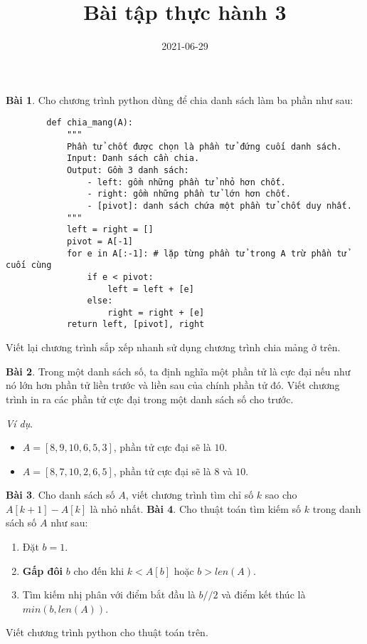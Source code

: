 \documentclass[12pt, a4paper]{article}
\title{Bài tập thực hành 3}
\date{2021-06-29}
\author{}
\begin{document}
    \onehalfspacing
    \maketitle
    \textbf{Bài 1}. Cho chương trình python dùng để chia danh sách làm ba phần như sau:
    \begin{verbatim}
        def chia_mang(A):
            """
            Phần tử chốt được chọn là phần tử đứng cuối danh sách.
            Input: Danh sách cần chia.
            Output: Gồm 3 danh sách:
                - left: gồm những phần tử nhỏ hơn chốt.
                - right: gồm những phần tử lớn hơn chốt.
                - [pivot]: danh sách chứa một phần tử chốt duy nhất.
            """
            left = right = []
            pivot = A[-1]
            for e in A[:-1]: # lặp từng phần tử trong A trừ phần tử cuối cùng
                if e < pivot:
                    left = left + [e]
                else:
                    right = right + [e]
            return left, [pivot], right
    \end{verbatim}
    Viết lại chương trình sắp xếp nhanh sử dụng chương trình chia mảng ở trên.

    \textbf{Bài 2}. Trong một danh sách số, ta định nghĩa một phần tử là cực đại nếu như 
    nó lớn hơn phần tử liền trước và liền sau của chính phần tử đó.
    Viết chương trình in ra các phần tử cực đại trong một danh sách số cho trước.

    \textit{Ví dụ}. 
    \begin{itemize}
        \item $A = [8, 9, 10, 6, 5, 3]$, phần tử cực đại sẽ là $10$.
        \item $A = [8, 7, 10, 2, 6, 5]$, phần tử cực đại sẽ là $8$ và $10$.
    \end{itemize}
    
    \textbf{Bài 3}. Cho danh sách số $A$, viết chương trình tìm chỉ số $k$ sao cho $A[k+1]-A[k]$ là nhỏ nhất.
    \newpage
    \textbf{Bài 4}. Cho thuật toán tìm kiếm số $k$ trong danh sách số $A$ như sau:
    \begin{enumerate}
        \item Đặt $b = 1$.
        \item \textbf{Gấp đôi} $b$ cho đến khi $k < A[b]$ hoặc $b > len(A)$.
        \item Tìm kiếm nhị phân với điểm bắt đầu là $b//2$ và điểm kết thúc là $min(b, len(A))$.
    \end{enumerate}
    Viết chương trình python cho thuật toán trên.
\end{document}
